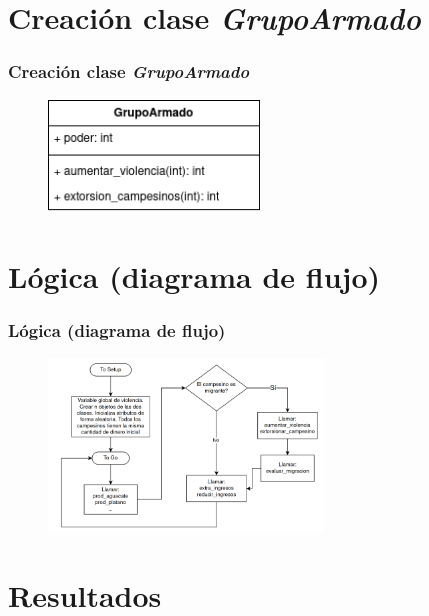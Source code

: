 \documentclass[17pt, t, lualatex]{beamer}
\begin{document}
\section{Creación clase \textit{GrupoArmado}}

\insertsectionpage

\begin{frame}
  \frametitle{Creación clase \textit{GrupoArmado}}
  \begin{figure}[ht]
    \centering
    \includegraphics[width = 0.5\textwidth]{img/ClaseGrupoArmado.png}
  \end{figure}
\end{frame}

    
\section{Lógica (diagrama de flujo)}

\insertsectionpage

\begin{frame}
  \frametitle{Lógica (diagrama de flujo)}
  \begin{figure}[ht]
    \centering
    \includegraphics[width = 0.65\textwidth]{img/img3.png}
  \end{figure}
\end{frame}





\section{Resultados}
\end{document}
